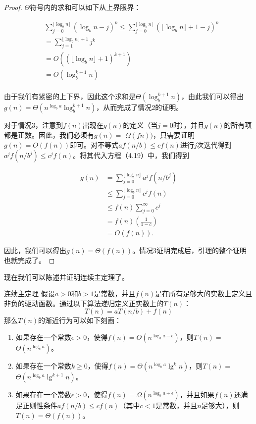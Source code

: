 \documentclass[lang=cn,newtx,10pt,scheme=chinese]{elegantbook}
\begin{document}
\begin{proof}
$\Theta$符号内的求和可以如下从上界限界：

$$
\begin{aligned}
& \sum_{j=0}^{\lfloor\log _b n\rfloor}(\log _b n-j)^k \leq \sum_{j=0}^{\lfloor\log _b n\rfloor}(\lfloor\log _b n\rfloor+1-j)^k \\
& =\sum_{j=1}^{\lfloor\log _b n\rfloor+1} j^k \\
& =O((\lfloor\log _b n\rfloor+1)^{k+1}) \\
& =O(\log _b^{k+1} n) \\
&
\end{aligned}
$$

由于我们有紧密的上下界，因此这个求和是$\Theta(\log _b^{k+1} n)$，由此我们可以得出$g(n)=\Theta(n^{\log _b a} \log _b^{k+1} n)$，从而完成了情况2的证明。

对于情况3，注意到$f(n)$出现在$g(n)$的定义（当$j=0$时），并且$g(n)$的所有项都是正数。因此，我们必须有$g(n)=$ $\Omega(f n))$，只需要证明$g(n)=O(f(n))$即可。对不等式$a f(n / b) \leq c f(n)$进行$j$次迭代得到$a^j f(n / b^j) \leq c^j f(n)$。将其代入方程（4.19）中，我们得到

$$
\begin{aligned}
g(n) & =\sum_{j=0}^{\lfloor\log _b n\rfloor} a^j f(n / b^j) \\
& \leq \sum_{j=0}^{\lfloor\log _b n\rfloor} c^j f(n) \\
& \leq f(n) \sum_{j=0}^{\infty} c^j \\
& =f(n)(\frac{1}{1-c}) \\
& =O(f(n)) .
\end{aligned}
$$

因此，我们可以得出$g(n)=\Theta(f(n))$。情况3证明完成后，引理的整个证明也就完成了。
\end{proof}

现在我们可以陈述并证明连续主定理了。

\begin{theorem}{连续主定理}{}
假设$a>0$和$b>1$是常数，并且$f(n)$是在所有足够大的实数上定义且非负的驱动函数。通过以下算法递归定义正实数上的$T(n)$：
$$
T(n)=a T(n / b)+f(n)
$$
那么$T(n)$的渐近行为可以如下刻画：
\begin{enumerate}
\item 如果存在一个常数$\epsilon>0$，使得$f(n)=O(n^{\log _b a-\epsilon})$，则$T(n)=$ $\Theta(n^{\log _b a})$。
\item 如果存在一个常数$k \geq 0$，使得$f(n)=\Theta(n^{\log _b a} \lg ^k n)$，则$T(n)=$ $\Theta(n^{\log _b a} \lg ^{k+1} n)$。
\item 如果存在一个常数$\epsilon>0$，使得$f(n)=\Omega(n^{\log _b a+\epsilon})$，并且如果$f(n)$还满足正则性条件$a f(n / b) \leq c f(n)$（其中$c<1$是常数，并且$n$足够大），则$T(n)=\Theta(f(n))$。
\end{enumerate}
\end{theorem}
\end{document}
